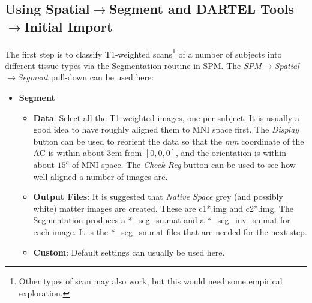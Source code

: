 \subsection{Using Spatial$\rightarrow$Segment and DARTEL Tools$\rightarrow$Initial Import}
The first step is to classify T1-weighted scans\footnote{Other types of scan may also work, but this would need some empirical exploration.} of a number of subjects into different tissue types via the Segmentation routine in SPM.
The \emph{SPM$\rightarrow$Spatial$\rightarrow$Segment} pull-down can be used here:
\begin{itemize}
\item{{\bf Segment}
  \begin{itemize}
  \item{{\bf Data}: Select all the T1-weighted images, one per subject.  It is usually a good idea to have roughly aligned them to MNI space first.  The \emph{Display} button can be used to reorient the data so that the \emph{mm} coordinate of the AC is within about 3cm from $[0, 0, 0]$, and the orientation is within about $15^o$ of MNI space.  The \emph{Check Reg} button can be used to see how well aligned a number of images are.
  }
  \item{{\bf Output Files}: It is suggested that \emph{Native Space} grey (and possibly white) matter images are created. These are c1*.img and c2*.img.  The Segmentation produces a *\_seg\_sn.mat and a *\_seg\_inv\_sn.mat for each image.  It is the *\_seg\_sn.mat files that are needed for the next step.
  }
  \item{{\bf Custom}: Default settings can usually be used here.
  }
  \end{itemize}
}
\end{itemize}

